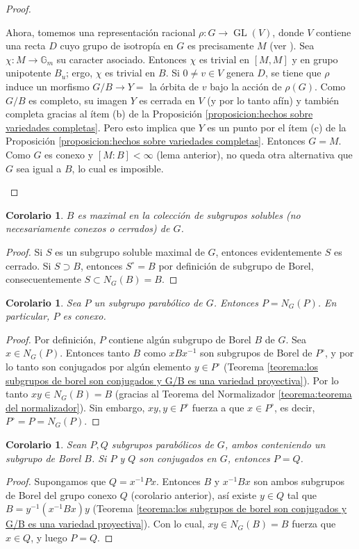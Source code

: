 \documentclass[spanish,12pt]{amsart}
\newtheorem{corollary}[theorem]{Corolario}
\theoremstyle{definition}
\theoremstyle{remark}
\numberwithin{equation}{section}
\begin{document}
\begin{proof}
\begin{enumerate}
Ahora, tomemos una representación racional $\rho : G \rightarrow \operatorname{GL}(V)$, donde $V$ contiene una recta $D$ cuyo grupo de isotropía en $G$ es precisamente $M$ (ver \cite[Teorema 11.2]{humphreys2012linearAlgebraicGroups}). Sea $\chi : M \to \mathbb{G}_m$ su caracter asociado. Entonces $\chi$ es trivial en $[M,M]$ y en grupo unipotente $B_u$; ergo, $\chi$ es trivial en $B$. Si $0 \neq v \in V$ genera $D$, se tiene que $\rho$ induce un morfismo $G/B \to Y =$ la órbita de $v$ bajo la acción de $\rho (G)$. Como $G/B$ es completo, su imagen $Y$ es cerrada en $V$ (y por lo tanto afín) y también completa gracias al ítem (b) de la Proposición \ref{proposicion:hechos sobre variedades completas}. Pero esto implica que $Y$ es un punto por el ítem (c) de la Proposición \ref{proposicion:hechos sobre variedades completas}. Entonces $G = M$. Como $G$ es conexo y $[M : B] < \infty$ (lema anterior), no queda otra alternativa que $G$ sea igual a $B$, lo cual es imposible.
\end{enumerate}
\end{proof}

\begin{corollary}
$B$ es maximal en la colección de subgrupos solubles (no necesariamente conexos o cerrados) de $G$.
\end{corollary}
\begin{proof}
Si $S$ es un subgrupo soluble maximal de $G$, entonces evidentemente $S$ es cerrado. Si $S \supset B$, entonces $S^\circ = B$ por definición de subgrupo de Borel, consecuentemente $S \subset N_G (B) = B$.
\end{proof}

\begin{corollary}
Sea $P$ un subgrupo parabólico de $G$. Entonces $P = N_G (P)$. En particular, $P$ es conexo.
\end{corollary}
\begin{proof}
Por definición, $P$ contiene algún subgrupo de Borel $B$ de $G$. Sea $x \in N_G (P)$. Entonces tanto $B$ como $x B x^{-1}$ son subgrupos de Borel de $P^\circ$, y por lo tanto son conjugados por algún elemento $y \in P^\circ$ (Teorema \ref{teorema:los subgrupos de borel son conjugados y G/B es una variedad proyectiva}). Por lo tanto $xy \in N_G (B) = B$ (gracias al Teorema del Normalizador \ref{teorema:teorema del normalizador}). Sin embargo, $xy, y \in P^\circ$ fuerza a que $x \in P^\circ$, es decir, $P^\circ = P = N_G (P)$.
\end{proof}

\begin{corollary}
Sean $P,Q$ subgrupos parabólicos de $G$, ambos conteniendo un subgrupo de Borel $B$. Si $P$ y $Q$ son conjugados en $G$, entonces $P = Q$.
\end{corollary}
\begin{proof}
Supongamos que $Q = x^{-1} P x$. Entonces $B$ y $x^{-1}B x$ son ambos subgrupos de Borel del grupo conexo $Q$ (corolario anterior), así existe $y \in Q$ tal que $B = y^{-1} (x ^{-1} B x) y$ (Teorema \ref{teorema:los subgrupos de borel son conjugados y G/B es una variedad proyectiva}). Con lo cual, $xy \in N_G (B) = B$ fuerza que $x \in Q$, y luego $P = Q$.
\end{proof}
\end{document}
